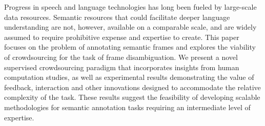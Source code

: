 Progress in speech and language technologies has long been fueled by large-scale data resources. Semantic resources that could facilitate deeper language understanding are not, however, available on a comparable scale, and are widely assumed to require prohibitive expense and expertise to create. This paper focuses on the problem of annotating semantic frames and explores the viability of crowdsourcing for the task of frame disambiguation. We present a novel supervised crowdsourcing paradigm that incorporates insights from human computation studies, as well as experimental results demonstrating the value of feedback, interaction and other innovations designed to accommodate the relative complexity of the task. These results suggest the feasibility of developing scalable methodologies for semantic annotation tasks requiring an intermediate level of expertise.
